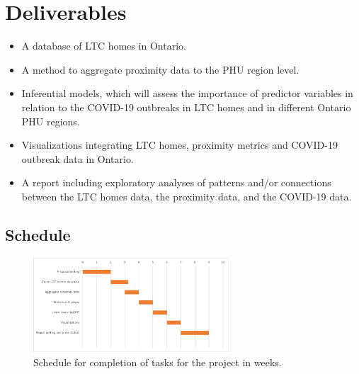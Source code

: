 \documentclass{article}
\begin{document}
\section{Deliverables}
\begin{center}
\begin{itemize}
\item A database of LTC homes in Ontario.

\item A method to aggregate proximity data to the PHU region level.

\item Inferential models, which will assess the importance of predictor variables in relation to the COVID-19 outbreaks in LTC homes and in different Ontario PHU regions.

\item Visualizations integrating LTC homes, proximity metrics and COVID-19 outbreak data in Ontario. 

\item A report including exploratory analyses of patterns and/or connections between the LTC homes data, the proximity data, and the COVID-19 data.

\end{itemize}
\end{center}

\subsection{Schedule}

\begin{figure}[h]
\begin{center}
\includegraphics[width=0.65\textwidth]{schedule} %
\caption{Schedule for completion of tasks for the project in weeks.}
\end{center}
\end{figure}
\end{document}
